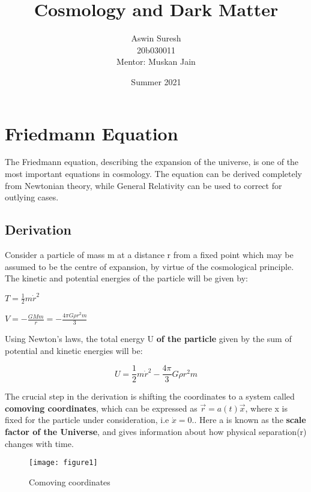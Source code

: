 \documentclass{article}
\title{\huge \color{white} Cosmology and Dark Matter}
\author{\color{white} \Large Aswin Suresh\\
        \color{white} \small 20b030011\\
        \color{white} \normalsize Mentor: Muskan Jain}
\date{\color{white} Summer 2021}
\begin{document}
\maketitle
\newpage
\tableofcontents
\newpage


\section{Friedmann Equation}
The Friedmann equation, describing the expansion of the universe, is one of the most important equations in cosmology. The equation can be derived completely from Newtonian theory, while General Relativity can be used to correct for outlying cases.

\subsection{Derivation}
Consider a particle of mass m at a distance r from a fixed point which may be assumed to be the centre of expansion, by virtue of the cosmological principle. The kinetic and potential energies of the particle will be given by:

\begin{center}
    $T = \frac{1}{2}m\dot{r}^2$ \\
\end{center}

\begin{center}
    $V = -\frac{GMm}{r} = -\frac{4\pi G \rho r^2 m}{3}$
\end{center}

Using Newton's laws, the total energy U \textbf{of the particle} given by the sum of potential and kinetic energies will be:

\begin{equation}
U = \frac{1}{2}m\dot{r}^2-\frac{4\pi}{3}G{\rho}r^2m
\end{equation}

The crucial step in the derivation is shifting the coordinates to a system called \textbf{comoving coordinates}, which can be expressed as $\vec{r}=a(t)\vec{x}$, where x is fixed for the particle under consideration, i.e $\dot{x}=0.$. Here a is known as the \textbf{scale factor of the Universe}, and gives information about how physical separation(r) changes with time.

\begin{figure}[H]
    \centering
    \texttt{[image: figure1]}
    \caption{Comoving coordinates}
    \label{fig:coord}
\end{figure}
\end{document}
